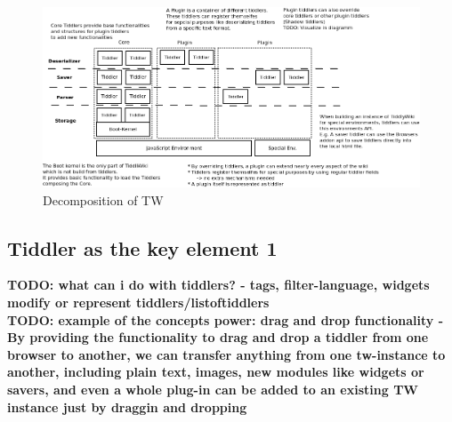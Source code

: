 \documentclass[12pt,a4paper]{article}
\newcommand{\todo}[1]{{\bf TODO: #1}\\
}
\begin{document}
\begin{figure}[hbtp]
\includegraphics[scale=0.4]{images/overview.png}
\caption{Decomposition of TW}
\end{figure}
\newpage
\subsection{Tiddler as the key element 1}
\todo{what can i do with tiddlers? - tags, filter-language, widgets modify or represent tiddlers/listoftiddlers}
\todo{example of the concepts power: drag and drop functionality - By providing the functionality to drag and drop a tiddler from one browser to another, we can transfer anything from one tw-instance to another, including plain text, images, new modules like widgets or savers, and even a whole plug-in can be added to an existing TW instance just by draggin and dropping}
\end{document}
